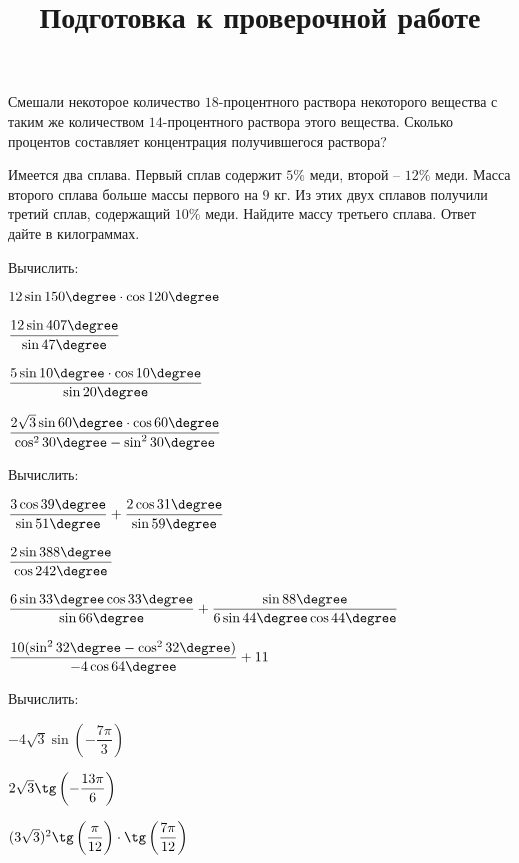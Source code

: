 \begin{listofex}
	\item Смешали некоторое количество \( 18 \)-процентного раствора некоторого вещества с таким же количеством \( 14 \)-процентного раствора этого вещества. Сколько процентов составляет концентрация получившегося раствора?
	\item Имеется два сплава. Первый сплав содержит \( 5\% \) меди, второй – \( 12\% \) меди. Масса второго сплава больше массы первого на \( 9 \) кг. Из этих двух сплавов получили третий сплав, содержащий \( 10\% \) меди. Найдите массу третьего сплава. Ответ дайте в килограммах.
\end{listofex}
\newpage
\title{Подготовка к проверочной работе}
\begin{listofex}
	\item Вычислить:
\begin{enumcols}[itemcolumns=2]
	\item \( 12\sin150\degree\cdot\cos120\degree \) 
	\item \( \dfrac{12\sin407\degree}{\sin47\degree} \)
	\item \( \dfrac{5\sin10\degree\cdot\cos10\degree}{\sin20\degree} \)
	\item \( \dfrac{2\sqrt{3}\sin60\degree\cdot\cos60\degree}{\cos^2 30\degree - \sin^2 30\degree} \)
\end{enumcols}
	\item Вычислить:
	\begin{enumcols}[itemcolumns=2]
		\item \( \dfrac{3\cos39\degree}{\sin51\degree}+\dfrac{2\cos31\degree}{\sin59\degree} \) 
		\item \( \dfrac{2\sin388\degree}{\cos242\degree} \) 
		\item \( \dfrac{6\sin33\degree\cos33\degree}{\sin66\degree}+\dfrac{\sin88\degree}{6\sin44\degree\cos44\degree} \) 
		\item \( \dfrac{10(\sin^2 32\degree-\cos^2 32\degree)}{-4\cos64\degree}+11 \) 
	\end{enumcols}
	\item Вычислить:
	\begin{enumcols}[itemcolumns=2]
		\item \( -4\sqrt{3}\sin\left( -\dfrac{7\pi}{3} \right) \) 
		\item \( 2\sqrt{3}\tg\left( -\dfrac{13\pi}{6} \right) \) 
		\item \( (3\sqrt{3})^2\tg\left( \dfrac{\vphantom{7}\pi}{12} \right)\cdot\tg\left( \dfrac{7\pi}{12} \right) \) 

\end{enumcols}
\end{listofex}
